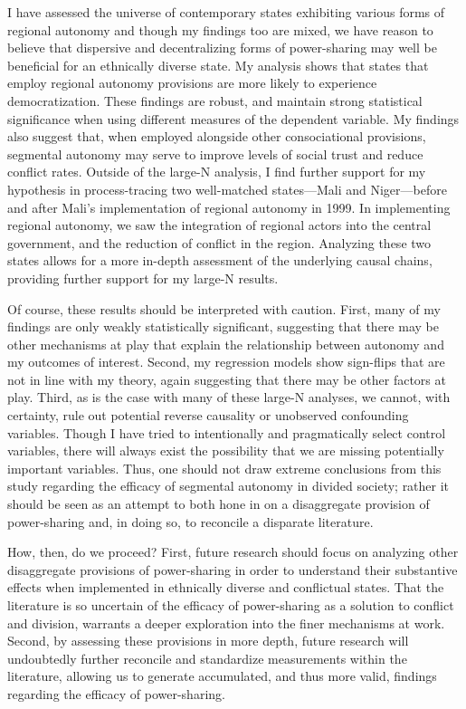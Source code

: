 \documentclass[12pt]{article}
\begin{document}
I have assessed the universe of contemporary states exhibiting various forms of regional autonomy and though my findings too are mixed, we have reason to believe that dispersive and decentralizing forms of power-sharing may well be beneficial for an ethnically diverse state. My analysis shows that states that employ regional autonomy provisions are more likely to experience democratization. These findings are robust, and maintain strong statistical significance when using different measures of the dependent variable. My findings also suggest that, when employed alongside other consociational provisions, segmental autonomy may serve to improve levels of social trust and reduce conflict rates. Outside of the large-N analysis, I find further support for my hypothesis in process-tracing two well-matched states---Mali and Niger---before and after Mali's implementation of regional autonomy in 1999. In implementing regional autonomy, we saw the integration of regional actors into the central government, and the reduction of conflict in the region. Analyzing these two states allows for a more in-depth assessment of the underlying causal chains, providing further support for my large-N results.  

Of course, these results should be interpreted with caution. First, many of my findings are only weakly statistically significant, suggesting that there may be other mechanisms at play that explain the relationship between autonomy and my outcomes of interest. Second, my regression models show sign-flips that are not in line with my theory, again suggesting that there may be other factors at play. Third, as is the case with many of these large-N analyses, we cannot, with certainty, rule out potential reverse causality or unobserved confounding variables. Though I have tried to intentionally and pragmatically select control variables, there will always exist the possibility that we are missing potentially important variables. Thus, one should not draw extreme conclusions from this study regarding the efficacy of segmental autonomy in divided society; rather it should be seen as an attempt to both hone in on a disaggregate provision of power-sharing and, in doing so, to reconcile a disparate literature.

How, then, do we proceed? First, future research should focus on analyzing other disaggregate provisions of power-sharing in order to understand their substantive effects when implemented in ethnically diverse and conflictual states. That the literature is so uncertain of the efficacy of power-sharing as a solution to conflict and division, warrants a deeper exploration into the finer mechanisms at work. Second, by assessing these provisions in more depth, future research will undoubtedly further reconcile and standardize measurements within the literature, allowing us to generate accumulated, and thus more valid, findings regarding the efficacy of power-sharing.
\end{document}
